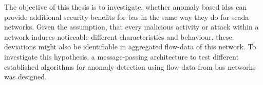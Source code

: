 
\begin{comment}
\begin{itemize}
	\item experiment
	\item test data captured from a floor section of the computer science building
	\item enriched with malicious packets to keep consistent
	
	\item (focusses only an purpose based) attack classes (cf. \parencite{Uma2013})
		\subitem \gls{dos}
			\subsubitem Short circuit -> blackout on entire line
			\subsubitem flooding of \code{A\_Restart} telegrams
			\subsubitem flooding nonsense
		\subitem replay
			\subsubitem repeating a time window
			\subsubitem sniff a tag and repeat it compressed??? \alert{whatever this means?}
			\subsubitem do inverse action
		\subitem manipulation/reconfiguration
			\subsubitem telegram manipulation
			\subsubitem reconfiguration of devices (Access Attack)
			\subsubitem reconfigure line couplers/make them useless (Access Attack)
		\subitem spoofing 
		\subitem Reconnaissance Attack
			\subsubitem network mapping
			
		\subitem 
	
	\item aim is to show if attacks can be identified by anomaly detection on flow data
		\subitem under the assumption, that attacks noticeable alter the characteristic and behaviour of \gls{knx} traffic
		\subitem cf. \parencite{Mukherjee1994,Yang2006,Pan2014}
	\item demonstrate a message-passing architecture to perform online analytics on \gls{knx} flow-data
	\item benchmark different algorithms against each other
\end{itemize}
\end{comment}

The objective of this thesis is to investigate, whether anomaly based \glspl{ids} can provide additional security benefits for \gls{bas} in the same way they do for \gls{scada} networks. %
Given the assumption, that every malicious activity or attack within a network induces noticeable different characteristics and behaviour, these deviations might also be identifiable in aggregated flow-data of this network. \parencite[cf.][]{Mukherjee1994,Yang2006,Pan2014}
To investigate this hypothesis, a message-passing architecture to test different established algorithms for anomaly detection using flow-data from \gls{bas} networks was designed.

